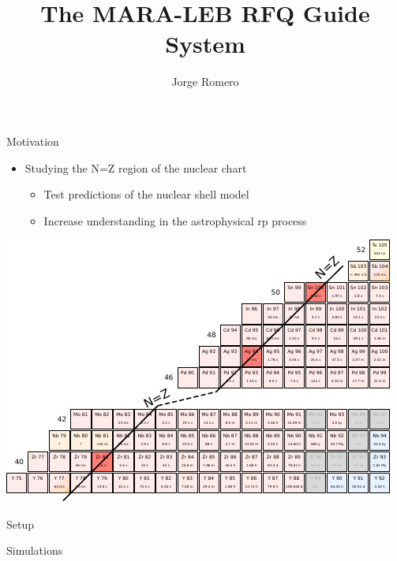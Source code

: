 \documentclass{beamer}
\title{The MARA-LEB RFQ Guide System}
\date{}
\author[auth]{Jorge Romero}
\institute[inst]{Jyväskylän Yliopisto}
\begin{document}
\begin{frame}
\titlepage
\end{frame}

\begin{frame}{Motivation}
    \vspace*{4em}
    \begin{itemize}
        \item Studying the N=Z region of the nuclear chart 
        \begin{itemize}
            \item<2-> Test predictions of the nuclear shell model
            \item<3-> Increase understanding in the astrophysical rp process
        \end{itemize}
    \end{itemize}
    \vspace*{1em}
   
    \flushright
    \vspace*{-5em}
    \includegraphics[scale=0.9]{assets/chart.pdf}
\end{frame}

\begin{frame}{Setup}
    
\end{frame}

\begin{frame}{Simulations}
    
\end{frame}
\end{document}
